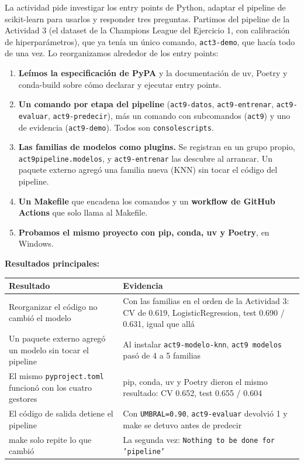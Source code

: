 \documentclass[12pt,a4paper]{article}
\renewcommand{\_}{\guionbajo\allowbreak}
\begin{document}
La actividad pide investigar los entry points de Python, adaptar el pipeline de scikit-learn para
usarlos y responder tres preguntas. Partimos del pipeline de la Actividad 3 (el dataset de la
Champions League del Ejercicio 1, con calibración de hiperparámetros), que ya tenía un único
comando, \texttt{act3-demo}, que hacía todo de una vez. Lo reorganizamos alrededor de los entry
points:

\begin{enumerate}[leftmargin=1.4em]
\item \textbf{Leímos la especificación de PyPA} y la documentación de uv, Poetry y conda-build
sobre cómo declarar y ejecutar entry points.
\item \textbf{Un comando por etapa del pipeline} (\texttt{act9-datos}, \texttt{act9-entrenar},
\texttt{act9-evaluar}, \texttt{act9-predecir}), más un comando con subcomandos (\texttt{act9}) y
uno de evidencia (\texttt{act9-demo}). Todos son \texttt{console\_scripts}.
\item \textbf{Las familias de modelos como plugins.} Se registran en un grupo propio,
\texttt{act9\_pipeline.modelos}, y \texttt{act9-entrenar} las descubre al arrancar. Un paquete
externo agregó una familia nueva (KNN) sin tocar el código del pipeline.
\item \textbf{Un Makefile} que encadena los comandos y un \textbf{workflow de GitHub Actions} que
solo llama al Makefile.
\item \textbf{Probamos el mismo proyecto con pip, conda, uv y Poetry}, en Windows.
\end{enumerate}

\textbf{Resultados principales:}

\begin{center}
\small
\renewcommand{\arraystretch}{1.3}
\begin{tabular}{|>{\raggedright\arraybackslash}p{7.2cm}|>{\raggedright\arraybackslash}p{6.4cm}|}
\hline
\textbf{Resultado} & \textbf{Evidencia} \\
\hline
Reorganizar el código no cambió el modelo & Con las familias en el orden de la Actividad 3: CV de
0.619, LogisticRegression, test 0.690 / 0.631, igual que allá \\
\hline
Un paquete externo agregó un modelo sin tocar el pipeline & Al instalar \texttt{act9-modelo-knn},
\texttt{act9 modelos} pasó de 4 a 5 familias \\
\hline
El mismo \texttt{pyproject.toml} funcionó con los cuatro gestores & pip, conda, uv y Poetry dieron
el mismo resultado: CV 0.652, test 0.655 / 0.604 \\
\hline
El código de salida detiene el pipeline & Con \texttt{UMBRAL=0.90}, \texttt{act9-evaluar} devolvió
1 y make se detuvo antes de predecir \\
\hline
make solo repite lo que cambió & La segunda vez: \texttt{Nothing to be done for 'pipeline'} \\
\hline
\end{tabular}
\end{center}
\end{document}
